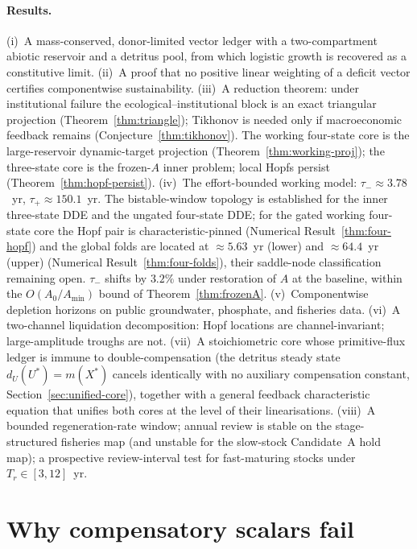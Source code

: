 \documentclass[11pt]{article}
\theoremstyle{definition}
\begin{document}
\paragraph{Results.} (i)~A mass-conserved, donor-limited vector ledger with a two-compartment abiotic reservoir and a detritus pool, from which logistic growth is recovered as a constitutive limit. (ii)~A proof that no positive linear weighting of a deficit vector certifies componentwise sustainability. (iii)~A reduction theorem: under institutional failure the ecological--institutional block is an exact triangular projection (Theorem~\ref{thm:triangle}); Tikhonov is needed only if macroeconomic feedback remains (Conjecture~\ref{thm:tikhonov}). The working four-state core is the large-reservoir dynamic-target projection (Theorem~\ref{thm:working-proj}); the three-state core is the frozen-$A$ inner problem; local Hopfs persist (Theorem~\ref{thm:hopf-persist}). (iv)~The effort-bounded working model: $\tau_-\approx 3.78$~yr, $\tau_+\approx 150.1$~yr. The bistable-window topology is established for the inner three-state DDE and the ungated four-state DDE; for the gated working four-state core the Hopf pair is characteristic-pinned (Numerical Result~\ref{thm:four-hopf}) and the global folds are located at $\approx 5.63$~yr (lower) and $\approx 64.4$~yr (upper) (Numerical Result~\ref{thm:four-folds}), their saddle-node classification remaining open. $\tau_-$ shifts by $3.2\%$ under restoration of $A$ at the baseline, within the $O(A_0/A_{\min})$ bound of Theorem~\ref{thm:frozenA}. (v)~Componentwise depletion horizons on public groundwater, phosphate, and fisheries data. (vi)~A two-channel liquidation decomposition: Hopf locations are channel-invariant; large-amplitude troughs are not. (vii)~A stoichiometric core whose primitive-flux ledger is immune to double-compensation (the detritus steady state $d_U(U^*)=m(X^*)$ cancels identically with no auxiliary compensation constant, Section~\ref{sec:unified-core}), together with a general feedback characteristic equation that unifies both cores at the level of their linearisations. (viii)~A bounded regeneration-rate window; annual review is stable on the stage-structured fisheries map (and unstable for the slow-stock Candidate~A hold map); a prospective review-interval test for fast-maturing stocks under $T_r\in[3,12]$~yr.

\section{Why compensatory scalars fail}
\label{sec:why-frameworks-fail}
\end{document}
